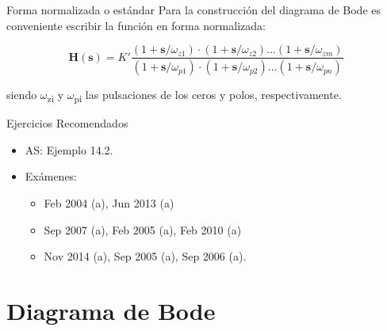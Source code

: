 \documentclass[aspectratio=169, usenames,svgnames,dvipsnames]{beamer}
\newcommand{\laplace}[1]{\mathbf{#1}(\mathbf{s})}
\newcommand{\slp}{\mathbf{s}}
\begin{document}
\begin{frame}[label={sec:orge6d0e78}]{Forma normalizada o estándar}
Para la construcción del diagrama de Bode es conveniente escribir la función en forma normalizada:

\[
  \laplace{H} = K' \frac{(1 + \slp/\omega_{z1}) \cdot (1 + \slp/\omega_{z2}) \ldots (1 + \slp/\omega_{zm})}{(1 + \slp/\omega_{p1}) \cdot (1 + \slp/\omega_{p2}) \ldots (1 + \slp/\omega_{pn})} 
\]

siendo \(\omega\)\textsubscript{zi} y \(\omega\)\textsubscript{pi} las pulsaciones de los ceros y polos, respectivamente.
\end{frame}
\begin{frame}[label={sec:org20d6577}]{Ejercicios Recomendados}
\begin{itemize}
\item AS: Ejemplo 14.2.
\item Exámenes:
\begin{itemize}
\item Feb 2004 (a), Jun 2013 (a)
\item Sep 2007 (a), Feb 2005 (a), Feb 2010 (a)
\item Nov 2014 (a), Sep 2005 (a), Sep 2006 (a).
\end{itemize}
\end{itemize}
\end{frame}
\section{Diagrama de Bode}
\label{sec:orgb1697f7}
\end{document}
